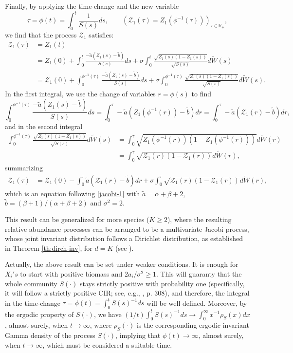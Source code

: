 \documentclass[12pt]{article}
\begin{document}
Finally, by applying the time-change and the new variable
\[
\tau=\phi(t)=\int_{0}^{t}\frac{1}{S(s)}ds,\qquad\left(\mathcal{Z}_1(\tau)=Z_1(\phi^{-1}(\tau))\right)_{\tau\in\mathbb{R}_+},
\]
we find that the process $\mathcal{Z}_1$ satisfies:
\begin{align*}
\mathcal{Z}_1(\tau) &= Z_1(t)
\\
&=Z_1(0)+\int_{0}^{t}\frac{-\tilde{a}(Z_1(s)-\tilde{b})}{S(s)}ds+\sigma\int_{0}^{t}\frac{\sqrt{Z_1(s)(1-Z_1(s))}}{\sqrt{S(s)}}d\tilde{W}(s)
\\
&=\mathcal Z_1(0)+\int_{0}^{\phi^{-1}(\tau)}\frac{-\tilde{a}(Z_1(s)-\tilde{b})}{S(s)}ds+\sigma\int_{0}^{\phi^{-1}(\tau)}\frac{\sqrt{Z_1(s)(1-Z_1(s))}}{\sqrt{S(s)}}d\tilde{W}(s).
\end{align*}
In the first integral, we use the change of variables $r=\phi(s)$ to find
\[
\int_{0}^{\phi^{-1}(\tau)}\frac{-\tilde{a}(Z_1(s)-\tilde{b})}{S(s)}ds = \int_{0}^{\tau}-\tilde{a}(Z_1(\phi^{-1}(r))-\tilde{b})dr = \int_{0}^{\tau}-\tilde{a}(\mathcal Z_1(r)-\tilde{b})dr,
\]
and in the second integral
\begin{align*}
\int_{0}^{\phi^{-1}(\tau)}\frac{\sqrt{Z_1(s)(1-Z_1(s))}}{\sqrt{S(s)}}d\tilde{W}(s)
&= \int_0^\tau \sqrt{Z_1(\phi^{-1}(r))(1-Z_1(\phi^{-1}(r)))}d\tilde{W}(r)
\\
&= \int_0^\tau \sqrt{\mathcal Z_1(r)(1-\mathcal Z_1(r))}d\tilde{W}(r),
\end{align*}
summarizing
\begin{align*}
\mathcal Z_1(\tau)&=\mathcal{Z}_1(0)-\int_{0}^{\tau}\tilde{a}(\mathcal{Z}_1(r)-\tilde{b})dr+\sigma\int_{0}^{\tau}\sqrt{\mathcal{Z}_1(r)(1-\mathcal{Z}_1(r))}d\tilde{W}(r),
\end{align*}
which is an equation following \eqref{jacobi-1} with $\tilde{a}=\alpha+\beta+2$, $\tilde{b}=(\beta+1)/(\alpha+\beta+2)$ and $\sigma^2=2$.



This result can be generalized for more species ($K\geq2$), where the resulting relative abundance processes can be arranged to be a multivariate Jacobi process, whose joint invariant distribution follows a Dirichlet distribution, as established in Theorem \ref{th:dirch-inv}, for $d=K$ (see \citep{gourieroux2006multivariate}).

\begin{rem}
Actually, the above result can be set under weaker conditions. It is enough for $X_i's$ to start with positive biomass and $2a_i/\sigma^2\geq1$. This will guaranty that the whole community $S(\cdot)$ stays strictly positive with probability one (specifically, it will follow a strictly positive CIR; see, e.g., \citep{mao2007stochastic}, p. 308), and therefore, the integral in the time-change $\tau=\phi(t)=\int_0^tS(s)^{-1}ds$ will be  well defined. Moreover, by the ergodic property of $S(\cdot)$, we have $(1/t)\int_0^tS(s)^{-1}ds\rightarrow\int_0^{\infty}x^{-1}\rho_{S}(x)dx$, almost surely, when $t\rightarrow\infty$, where $\rho_{S}(\cdot)$ is the corresponding ergodic invariant Gamma density of the process $S(\cdot)$, implying that $\phi(t)\rightarrow\infty$, almost surely, when $t\rightarrow\infty$, which must be considered a suitable time.
\end{rem} 
\end{document}
